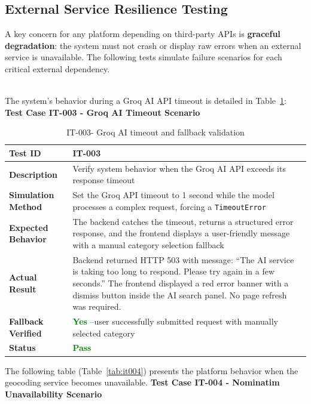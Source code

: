 \subsection{External Service Resilience Testing}

A key concern for any platform depending on third-party APIs is \textbf{graceful degradation}: the system must not crash or display raw errors when an external service is unavailable. The following tests simulate failure scenarios for each critical external dependency.


\\

The system's behavior during a Groq AI API timeout is detailed in Table~\ref{tab:it003}:
\textbf{Test Case IT-003 - Groq AI Timeout Scenario}
\begin{table}[H]
\caption{IT-003- Groq AI timeout and fallback validation}
\centering
\begin{tabular}{|l|p{10cm}|}
\hline
\textbf{Test ID} & IT-003 \\
\hline
\textbf{Description} & Verify system behavior when the Groq AI API exceeds its response timeout \\
\hline
\textbf{Simulation Method} & Set the Groq API timeout to 1 second while the model processes a complex request, forcing a \texttt{TimeoutError} \\
\hline
\textbf{Expected Behavior} & The backend catches the timeout, returns a structured error response, and the frontend displays a user-friendly message with a manual category selection fallback \\
\hline
\textbf{Actual Result} & Backend returned HTTP 503 with message: ``The AI service is taking too long to respond. Please try again in a few seconds.'' The frontend displayed a red error banner with a dismiss button inside the AI search panel. No page refresh was required. \\
\hline
\textbf{Fallback Verified} & \textcolor{green}{\textbf{Yes}} --user successfully submitted request with manually selected category \\
\hline
\textbf{Status} & \textcolor{green}{\textbf{Pass}} \\
\hline
\end{tabular}
\label{tab:it003}
\end{table}
\newpage
The following table (Table~\ref{tab:it004}) presents the platform behavior when the geocoding service becomes unavailable.
\textbf{Test Case IT-004 - Nominatim Unavailability Scenario}
